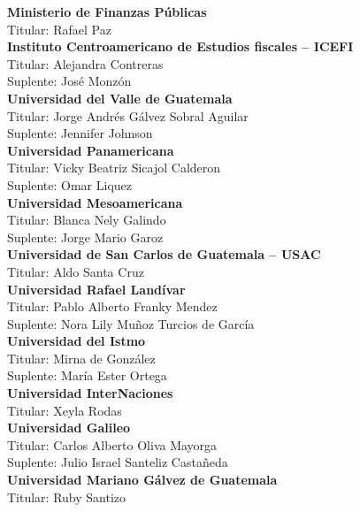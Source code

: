 \begin{multicols}{2}
\begin{center}
	\textbf{Ministerio de Finanzas Públicas}\\
	Titular: Rafael Paz\\ [0.4cm]
	
	\textbf{Instituto Centroamericano de Estudios fiscales – ICEFI}\\
	Titular: Alejandra Contreras\\
	Suplente: José Monzón\\ [0.4cm]
	
	\textbf{Universidad del Valle de Guatemala }\\
	Titular: Jorge Andrés Gálvez Sobral Aguilar \\
	Suplente: Jennifer Johnson\\ [0.4cm]
	
	\textbf{Universidad Panamericana}\\
	Titular: Vicky Beatriz Sicajol Calderon\\
	Suplente: Omar Liquez\\ [0.4cm]
	
	\textbf{Universidad Mesoamericana}\\
	Titular: Blanca Nely Galindo\\
	Suplente: Jorge Mario Garoz\\ [0.4cm]
	
	\textbf{Universidad de San Carlos de Guatemala – USAC}\\
	Titular: Aldo Santa Cruz\\ [0.4cm]
	
\textbf{	Universidad Rafael Landívar}\\
	Titular: Pablo Alberto Franky Mendez \\
	Suplente: Nora Lily Muñoz Turcios de García\\ [0.4cm]
	
	\textbf{Universidad del Istmo}\\
	Titular: Mirna de González\\
	Suplente: María Ester Ortega\\ [0.4cm]
	
	\textbf{Universidad InterNaciones}\\
	Titular: Xeyla Rodas\\ [0.4cm]
	
	\textbf{Universidad Galileo}\\
	Titular: Carlos Alberto Oliva Mayorga\\
	Suplente: Julio Israel Santeliz Castañeda\\ [0.4cm]
	
	\textbf{Universidad Mariano Gálvez de Guatemala}\\
	Titular: Ruby Santizo\\ [0.4cm]
	

\end{center}
\end{multicols}

